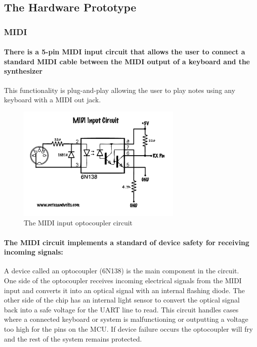\documentclass[acmlarge,screen]{acmart}
\begin{document}

\subsection{The Hardware Prototype}
	\subsubsection{MIDI}
	\paragraph{There is a 5-pin MIDI input circuit that allows the user to connect a standard MIDI cable between the MIDI output of a keyboard and the synthesizer} This functionality is plug-and-play allowing the user to play notes using any keyboard with a MIDI out jack.
	
	\begin{figure}
		\includegraphics[width=8cm]{midi_optocoupler_circuit}
		\caption{The MIDI input optocoupler circuit}
		\centering
	\end{figure}

	\paragraph{The MIDI circuit implements a standard of device safety for receiving incoming signals:} A device called an optocoupler (6N138) is the main component in the circuit. One side of the optocoupler receives incoming electrical signals from the MIDI input and converts it into an optical signal with an internal flashing diode. The other side of the chip has an internal light sensor to convert the optical signal back into a safe voltage for the UART line to read. This circuit handles cases where a connected keyboard or system is malfunctioning or outputting a voltage too high for the pins on the MCU. If device failure occurs the optocoupler will fry and the rest of the system remains protected. \cite{notesandvolts}
	
\end{document}
